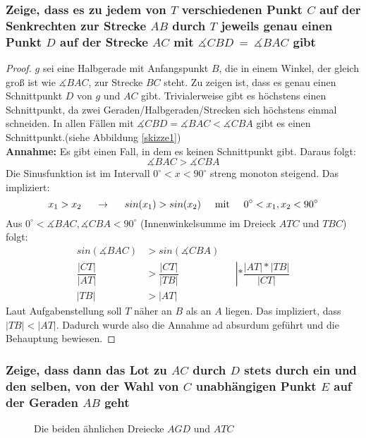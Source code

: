 \documentclass[12pt]{article}
\numberwithin{equation}{subsection}
\begin{document}
\subsubsection{Zeige, dass es zu jedem von $T$ verschiedenen Punkt $C$ auf der Senkrechten zur Strecke $AB $ durch $T$ jeweils genau einen Punkt $D$ auf der Strecke $AC$ mit $\measuredangle CBD\ = \ \measuredangle BAC$ gibt}
\begin{proof}
$g$ sei eine Halbgerade mit Anfangspunkt $B$, die in einem Winkel, der gleich groß ist wie $\measuredangle BAC$, zur Strecke $BC$ steht. Zu zeigen ist, dass es genau einen Schnittpunkt $D$ von $g$ und $AC$ gibt.
Trivialerweise gibt es höchstens einen Schnittpunkt, da zwei Geraden/Halbgeraden/Strecken sich höchstens einmal schneiden. In allen Fällen mit $\measuredangle CBD=\measuredangle BAC < \measuredangle CBA$ gibt es einen Schnittpunkt.(siehe Abbildung \ref{skizze1})\\
\textbf{Annahme:} Es gibt einen Fall, in dem es keinen Schnittpunkt gibt.
Daraus folgt: 
\[\measuredangle BAC > \measuredangle CBA\]
Die Sinusfunktion ist im Intervall $0^\circ<x<90^\circ$ streng monoton steigend. Das impliziert: \[x_1>x_2\hspace{5mm} \to \hspace{5mm} sin(x_1)>sin(x_2)\hspace{5mm} \mathrm{mit}\hspace{5mm} 0^\circ<x_1,x_2<90^\circ\]
Aus $0^\circ<\measuredangle BAC, \measuredangle CBA<90^\circ$ (Innenwinkelsumme im Dreieck $ATC$ und $TBC$) folgt:
\begin{align*}
	sin(\measuredangle BAC) &> sin(\measuredangle CBA)\\
	\dfrac{|CT|}{|AT|} &> \dfrac{|CT|}{|TB|}&&\left|*\dfrac{|AT|*|TB|}{|CT|}\right.\\
	|TB|&>|AT|
\end{align*}
Laut Aufgabenstellung soll $T$ näher an $B$ als an $A$ liegen. Das impliziert, dass $|TB|<|AT|$.
Dadurch wurde also die Annahme ad absurdum geführt und die Behauptung bewiesen.
\end{proof}

\subsubsection{Zeige, dass dann das Lot zu $AC$ durch $D$ stets durch ein und den selben, von der Wahl von $C$ unabhängigen Punkt $E$ auf der Geraden $AB$ geht}

\begin{figure}
	\caption{Die beiden ähnlichen Dreiecke $AGD$ und $ATC$}
	\label{Behauptung1}
\end{figure}
\end{document}
